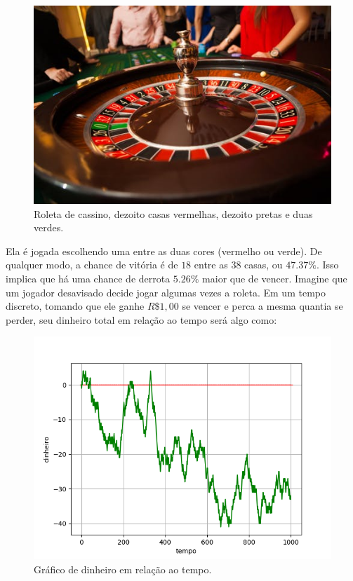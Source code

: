 \documentclass[12pt]{article}
\begin{document}
\begin{figure}[H]
\centering
\includegraphics[scale=0.55]{roleta.jpg}
\caption{Roleta de cassino, dezoito casas vermelhas, dezoito pretas e duas verdes.}
\end{figure}

Ela é jogada escolhendo uma entre as duas cores (vermelho ou verde). De qualquer modo, a chance de vitória é de $18$ entre as $38$ casas, ou $47.37\%$. Isso implica que há uma chance de derrota $5.26\%$ maior que de vencer. Imagine que um jogador desavisado decide jogar algumas vezes a roleta. Em um tempo discreto, tomando que ele ganhe $R\$1,00$ se vencer e perca a mesma quantia se perder, seu dinheiro total em relação ao tempo será algo como:

\begin{figure}[H]
\centering
\includegraphics[scale=0.7]{graph4.png}
\caption{Gráfico de dinheiro em relação ao tempo.}
\end{figure}
\end{document}
